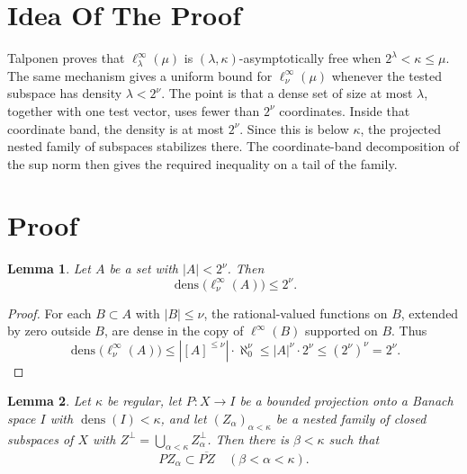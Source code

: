 \documentclass[11pt]{article}
\newtheorem{lemma}{Lemma}
\newcommand{\dens}{\operatorname{dens}}
\begin{document}
\section*{Idea Of The Proof}

Talponen proves that \(\ell_\lambda^\infty(\mu)\) is
\((\lambda,\kappa)\)-asymptotically free when \(2^\lambda<\kappa\leq\mu\).  The
same mechanism gives a uniform bound for \(\ell_\nu^\infty(\mu)\) whenever the
tested subspace has density \(\lambda<2^\nu\).  The point is that a dense set
of size at most \(\lambda\), together with one test vector, uses fewer than
\(2^\nu\) coordinates.  Inside that coordinate band, the density is at most
\(2^\nu\).  Since this is below \(\kappa\), the projected nested family of
subspaces stabilizes there.  The coordinate-band decomposition of the sup norm
then gives the required inequality on a tail of the family.

\section*{Proof}

\begin{lemma}
\label{lem:band-density}
Let \(A\) be a set with \(|A|<2^\nu\).  Then
\[
  \dens\bigl(\ell_\nu^\infty(A)\bigr)\leq 2^\nu .
\]
\end{lemma}

\begin{proof}
For each \(B\subset A\) with \(|B|\leq\nu\), the rational-valued functions on
\(B\), extended by zero outside \(B\), are dense in the copy of \(\ell^\infty(B)\)
supported on \(B\).  Thus
\[
  \dens\bigl(\ell_\nu^\infty(A)\bigr)
  \leq |[A]^{\leq\nu}|\cdot \aleph_0^\nu
  \leq |A|^\nu\cdot 2^\nu
  \leq (2^\nu)^\nu
  =2^\nu .
\]
\end{proof}

\begin{lemma}
\label{lem:projection-stabilization}
Let \(\kappa\) be regular, let \(P:X\to I\) be a bounded projection onto a
Banach space \(I\) with \(\dens(I)<\kappa\), and let
\((Z_\alpha)_{\alpha<\kappa}\) be a nested family of closed subspaces of \(X\)
with \(Z^\perp=\bigcup_{\alpha<\kappa}Z_\alpha^\perp\).  Then there is
\(\beta<\kappa\) such that
\[
  PZ_\alpha\subset \overline{PZ}\quad(\beta<\alpha<\kappa).
\]
\end{lemma}
\end{document}
